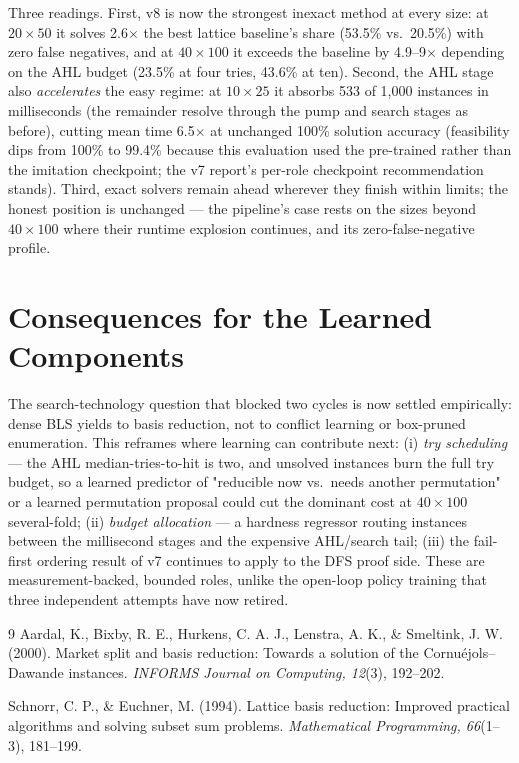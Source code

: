 \documentclass[12pt]{article}
\begin{document}
Three readings. First, v8 is now the strongest inexact method at every size: at $20 \times 50$ it solves 2.6$\times$ the best lattice baseline's share (53.5\% vs.\ 20.5\%) with zero false negatives, and at $40 \times 100$ it exceeds the baseline by 4.9--9$\times$ depending on the AHL budget (23.5\% at four tries, 43.6\% at ten). Second, the AHL stage also \emph{accelerates} the easy regime: at $10 \times 25$ it absorbs 533 of 1{,}000 instances in milliseconds (the remainder resolve through the pump and search stages as before), cutting mean time 6.5$\times$ at unchanged 100\% solution accuracy (feasibility dips from 100\% to 99.4\% because this evaluation used the pre-trained rather than the imitation checkpoint; the v7 report's per-role checkpoint recommendation stands). Third, exact solvers remain ahead wherever they finish within limits; the honest position is unchanged --- the pipeline's case rests on the sizes beyond $40 \times 100$ where their runtime explosion continues, and its zero-false-negative profile.

\section{Consequences for the Learned Components}

The search-technology question that blocked two cycles is now settled empirically: dense BLS yields to basis reduction, not to conflict learning or box-pruned enumeration. This reframes where learning can contribute next: (i) \emph{try scheduling} --- the AHL median-tries-to-hit is two, and unsolved instances burn the full try budget, so a learned predictor of "reducible now vs.\ needs another permutation" or a learned permutation proposal could cut the dominant cost at $40 \times 100$ several-fold; (ii) \emph{budget allocation} --- a hardness regressor routing instances between the millisecond stages and the expensive AHL/search tail; (iii) the fail-first ordering result of v7 continues to apply to the DFS proof side. These are measurement-backed, bounded roles, unlike the open-loop policy training that three independent attempts have now retired.

\begin{thebibliography}{9}
Aardal, K., Bixby, R. E., Hurkens, C. A. J., Lenstra, A. K., \& Smeltink, J. W. (2000). Market split and basis reduction: Towards a solution of the Cornu\'ejols--Dawande instances. \emph{INFORMS Journal on Computing, 12}(3), 192--202.

Schnorr, C. P., \& Euchner, M. (1994). Lattice basis reduction: Improved practical algorithms and solving subset sum problems. \emph{Mathematical Programming, 66}(1--3), 181--199.
\end{thebibliography}
\end{document}
